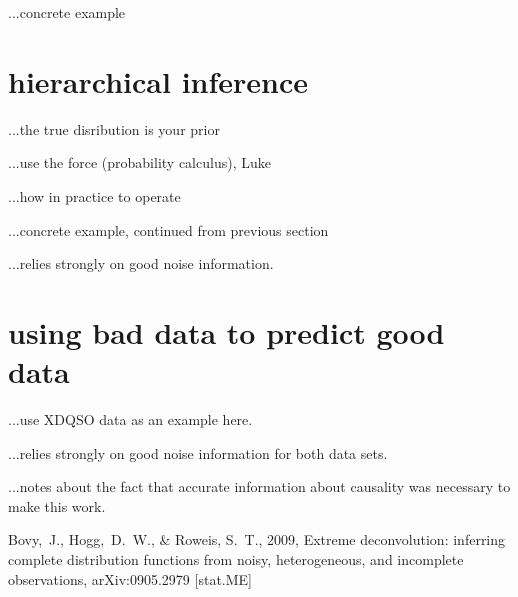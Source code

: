 \documentclass[12pt,twoside]{article}
\begin{document}
...concrete example

\section{hierarchical inference}

...the true disribution is your prior

...use the force (probability calculus), Luke

...how in practice to operate

...concrete example, continued from previous section

...relies strongly on good noise information.

\section{using bad data to predict good data}

...use XDQSO data as an example here.

...relies strongly on good noise information for both data sets.

...notes about the fact that accurate information about causality was
necessary to make this work.

\clearpage
{}\theendnotes

\clearpage
\begin{thebibliography}{}
  Bovy,~J., Hogg,~D.~W., \& Roweis, S.~T., 2009,
  Extreme deconvolution: inferring complete distribution functions from noisy, heterogeneous, and incomplete observations, 
  arXiv:0905.2979 [stat.ME]
\end{thebibliography}
\end{document}
